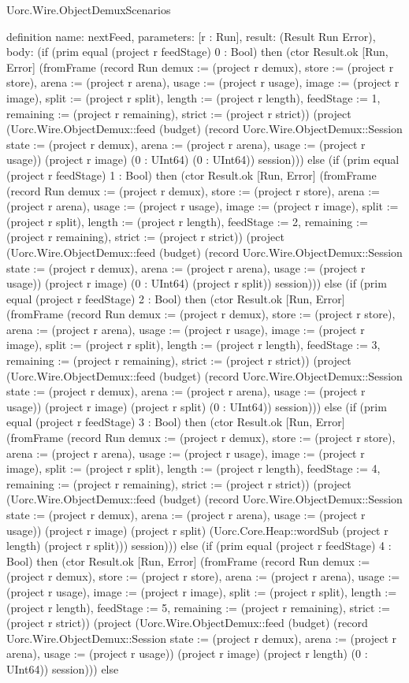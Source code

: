 \begin{lexlean}{Uorc.Wire.ObjectDemuxScenarios}
\begin{semanticmodule}
definition{
  name: nextFeed,
  parameters: [r : Run],
  result: (Result Run Error),
  body: (if (prim equal (project r feedStage) 0 : Bool) then (ctor Result.ok [Run, Error] (fromFrame (record Run {demux := (project r demux), store := (project r store), arena := (project r arena), usage := (project r usage), image := (project r image), split := (project r split), length := (project r length), feedStage := 1, remaining := (project r remaining), strict := (project r strict)}) (project (Uorc.Wire.ObjectDemux::feed (budget) (record Uorc.Wire.ObjectDemux::Session {state := (project r demux), arena := (project r arena), usage := (project r usage)}) (project r image) (0 : UInt64) (0 : UInt64)) session))) else (if (prim equal (project r feedStage) 1 : Bool) then (ctor Result.ok [Run, Error] (fromFrame (record Run {demux := (project r demux), store := (project r store), arena := (project r arena), usage := (project r usage), image := (project r image), split := (project r split), length := (project r length), feedStage := 2, remaining := (project r remaining), strict := (project r strict)}) (project (Uorc.Wire.ObjectDemux::feed (budget) (record Uorc.Wire.ObjectDemux::Session {state := (project r demux), arena := (project r arena), usage := (project r usage)}) (project r image) (0 : UInt64) (project r split)) session))) else (if (prim equal (project r feedStage) 2 : Bool) then (ctor Result.ok [Run, Error] (fromFrame (record Run {demux := (project r demux), store := (project r store), arena := (project r arena), usage := (project r usage), image := (project r image), split := (project r split), length := (project r length), feedStage := 3, remaining := (project r remaining), strict := (project r strict)}) (project (Uorc.Wire.ObjectDemux::feed (budget) (record Uorc.Wire.ObjectDemux::Session {state := (project r demux), arena := (project r arena), usage := (project r usage)}) (project r image) (project r split) (0 : UInt64)) session))) else (if (prim equal (project r feedStage) 3 : Bool) then (ctor Result.ok [Run, Error] (fromFrame (record Run {demux := (project r demux), store := (project r store), arena := (project r arena), usage := (project r usage), image := (project r image), split := (project r split), length := (project r length), feedStage := 4, remaining := (project r remaining), strict := (project r strict)}) (project (Uorc.Wire.ObjectDemux::feed (budget) (record Uorc.Wire.ObjectDemux::Session {state := (project r demux), arena := (project r arena), usage := (project r usage)}) (project r image) (project r split) (Uorc.Core.Heap::wordSub (project r length) (project r split))) session))) else (if (prim equal (project r feedStage) 4 : Bool) then (ctor Result.ok [Run, Error] (fromFrame (record Run {demux := (project r demux), store := (project r store), arena := (project r arena), usage := (project r usage), image := (project r image), split := (project r split), length := (project r length), feedStage := 5, remaining := (project r remaining), strict := (project r strict)}) (project (Uorc.Wire.ObjectDemux::feed (budget) (record Uorc.Wire.ObjectDemux::Session {state := (project r demux), arena := (project r arena), usage := (project r usage)}) (project r image) (project r length) (0 : UInt64)) session))) else }
\end{semanticmodule}
\end{lexlean}
